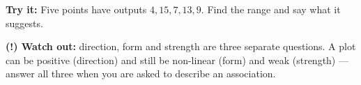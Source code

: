 \documentclass[12pt]{article}
\begin{document}
\begin{tryitbox}
\textbf{Try it:} \quad Five points have outputs $4, 15, 7, 13, 9$. Find the range and say what it
suggests.\\[2pt]
\end{tryitbox}

\begin{watchoutbox}
\textbf{(!) Watch out:} direction, form and strength are three separate questions. A plot can be
positive (direction) and still be non-linear (form) and weak (strength) --- answer all three when
you are asked to describe an association.
\end{watchoutbox}
\end{document}
